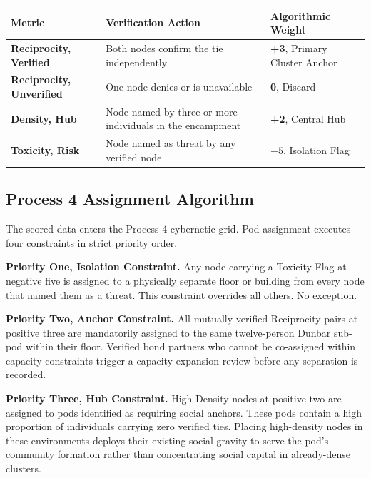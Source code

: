 \documentclass[12pt, letterpaper]{article}
\renewcommand{\arraystretch}{1.3}
\begin{document}
\begin{table}[H]
\renewcommand{\arraystretch}{1.2}
\begin{tabularx}{\textwidth}{@{} >{\raggedright\arraybackslash}p{3.5cm} >{\raggedright\arraybackslash}X >{\raggedright\arraybackslash}p{5.5cm} @{}}
\toprule
\textbf{Metric} & \textbf{Verification Action} & \textbf{Algorithmic Weight} \\
\midrule
\textbf{Reciprocity, Verified} & Both nodes confirm the tie independently & \textbf{+3}, Primary Cluster Anchor \\
\textbf{Reciprocity, Unverified} & One node denies or is unavailable & \textbf{0}, Discard \\
\textbf{Density, Hub} & Node named by three or more individuals in the encampment & \textbf{+2}, Central Hub \\
\textbf{Toxicity, Risk} & Node named as threat by any verified node & \textbf{$-5$}, Isolation Flag \\
\bottomrule
\end{tabularx}
\end{table}

\subsection{Process 4 Assignment Algorithm}

The scored data enters the Process 4 cybernetic grid. Pod assignment executes four constraints in strict priority order.

\textbf{Priority One, Isolation Constraint.} Any node carrying a Toxicity Flag at negative five is assigned to a physically separate floor or building from every node that named them as a threat. This constraint overrides all others. No exception.

\textbf{Priority Two, Anchor Constraint.} All mutually verified Reciprocity pairs at positive three are mandatorily assigned to the same twelve-person Dunbar sub-pod within their floor. Verified bond partners who cannot be co-assigned within capacity constraints trigger a capacity expansion review before any separation is recorded.

\textbf{Priority Three, Hub Constraint.} High-Density nodes at positive two are assigned to pods identified as requiring social anchors. These pods contain a high proportion of individuals carrying zero verified ties. Placing high-density nodes in these environments deploys their existing social gravity to serve the pod's community formation rather than concentrating social capital in already-dense clusters.
\end{document}

